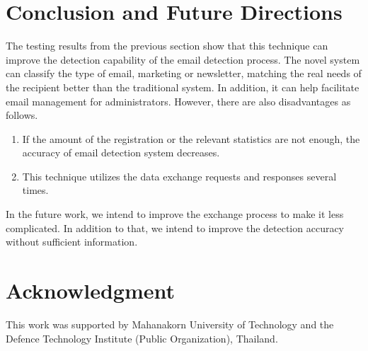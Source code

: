 \documentclass[conference]{IEEEtran}
\begin{document}
\section{Conclusion and Future Directions}

The testing results from the previous section show that this technique can improve the detection capability of the email detection process.
%
The novel system can classify the type of email, marketing or newsletter, matching the real needs of the recipient better than the traditional system.
%
In addition, it can help facilitate email management for administrators.
%
However, there are also disadvantages as follows.
%
\begin{enumerate}
   \item If the amount of the registration or the relevant statistics are not enough, the accuracy of email detection system decreases. 

   \item This technique utilizes the data exchange requests and responses  several times.
 \end{enumerate} 
%
In the future work, we intend to improve the exchange process to make it less complicated.
%
In addition to that, we intend to improve the detection accuracy without sufficient information.






\section*{Acknowledgment}
This work was supported by Mahanakorn University of Technology and the Defence Technology Institute (Public Organization), Thailand.







%
%
%
\end{document}

